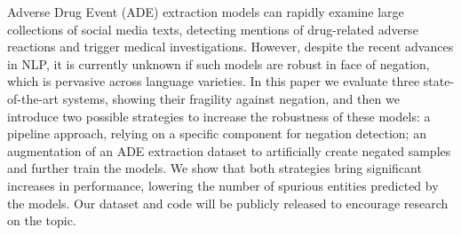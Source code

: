Adverse Drug Event (ADE) extraction models can rapidly examine large collections of social media texts, detecting mentions of drug-related adverse reactions and trigger medical investigations. However, despite the recent advances in NLP, it is currently unknown if such models are robust in face of negation, which is pervasive across language varieties. In this paper we evaluate three state-of-the-art systems, showing their fragility against negation, and then we introduce two possible strategies to increase the robustness of these models: a pipeline approach, relying on a specific component for negation detection; an augmentation of an ADE extraction dataset to  artificially create negated samples and further train the models. We show that both strategies bring significant increases in performance, lowering the number of spurious entities predicted by the models. Our dataset and code will be publicly released to encourage research on the topic.
